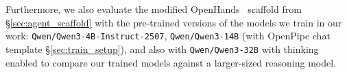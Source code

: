 Furthermore, we also evaluate the modified OpenHands~\citep{wang2025openhandssoftwareagentsdk} scaffold from \S\ref{sec:agent_scaffold} with the pre-trained versions of the models we train in our work: \texttt{Qwen/Qwen3-4B-Instruct-2507}, \texttt{Qwen/Qwen3-14B} (with OpenPipe chat template \S\ref{sec:train_setup}), and also with \texttt{Qwen/Qwen3-32B} with thinking enabled to compare our trained models against a larger-sized reasoning model.



